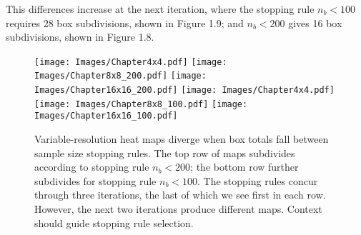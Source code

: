 This differences increase at the next iteration, where the stopping rule $n_{b} < 100$ requires 28 box subdivisions, shown in Figure 1.9; and $n_{b} < 200$ gives 16 box subdivisions, shown in Figure 1.8.
        \begin{figure}[H]
      	\centering      
      	\texttt{[image: Images/Chapter4x4.pdf]}
      	\texttt{[image: Images/Chapter8x8\_200.pdf]}
      	\texttt{[image: Images/Chapter16x16\_200.pdf]}
      	\texttt{[image: Images/Chapter4x4.pdf]}
      	\texttt{[image: Images/Chapter8x8\_100.pdf]}
      	\texttt{[image: Images/Chapter16x16\_100.pdf]}
      	\caption{Variable-resolution heat maps diverge when box totals fall between sample size stopping rules. The top row of maps subdivides according to stopping rule $n_{b} < 200$; the bottom row further subdivides for stopping rule $n_{b} < 100$. The stopping rules concur through three iterations, the last of which we see first in each row. However, the next two iterations produce different maps. Context should guide stopping rule selection.}
\end{figure}





% 
% 
% 
% 